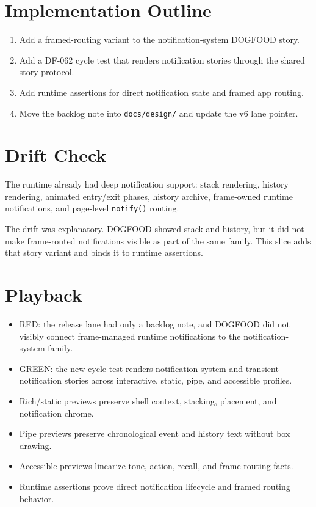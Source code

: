 \section{Implementation Outline}\label{record-103-implementation-outline}

\begin{enumerate}
\def\labelenumi{\arabic{enumi}.}
\tightlist
\item
  Add a framed-routing variant to the notification-system DOGFOOD story.
\item
  Add a DF-062 cycle test that renders notification stories through the shared story protocol.
\item
  Add runtime assertions for direct notification state and framed app routing.
\item
  Move the backlog note into \texttt{d\allowbreak{}o\allowbreak{}c\allowbreak{}s\allowbreak{}/\allowbreak{}d\allowbreak{}e\allowbreak{}s\allowbreak{}i\allowbreak{}g\allowbreak{}n\allowbreak{}/} and update the v6 lane pointer.
\end{enumerate}

\section{Drift Check}\label{record-103-drift-check}

The runtime already had deep notification support: stack rendering, history rendering, animated entry/exit phases, history archive, frame-owned runtime notifications, and page-level \texttt{n\allowbreak{}o\allowbreak{}t\allowbreak{}i\allowbreak{}f\allowbreak{}y\allowbreak{}(\allowbreak{})} routing.

The drift was explanatory. DOGFOOD showed stack and history, but it did not make frame-routed notifications visible as part of the same family. This slice adds that story variant and binds it to runtime assertions.

\section{Playback}\label{record-103-playback}

\begin{itemize}
\tightlist
\item
  RED: the release lane had only a backlog note, and DOGFOOD did not visibly connect frame-managed runtime notifications to the notification-system family.
\item
  GREEN: the new cycle test renders notification-system and transient notification stories across interactive, static, pipe, and accessible profiles.
\item
  Rich/static previews preserve shell context, stacking, placement, and notification chrome.
\item
  Pipe previews preserve chronological event and history text without box drawing.
\item
  Accessible previews linearize tone, action, recall, and frame-routing facts.
\item
  Runtime assertions prove direct notification lifecycle and framed routing behavior.
\end{itemize}


